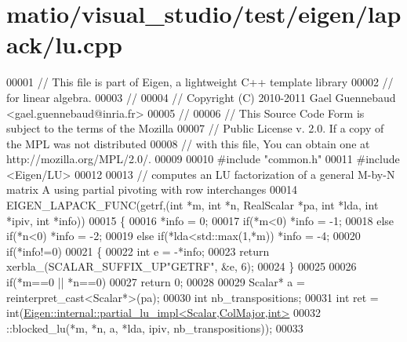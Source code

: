 \hypertarget{matio_2visual__studio_2test_2eigen_2lapack_2lu_8cpp_source}{}\section{matio/visual\+\_\+studio/test/eigen/lapack/lu.cpp}
\label{matio_2visual__studio_2test_2eigen_2lapack_2lu_8cpp_source}

\begin{DoxyCode}
00001 \textcolor{comment}{// This file is part of Eigen, a lightweight C++ template library}
00002 \textcolor{comment}{// for linear algebra.}
00003 \textcolor{comment}{//}
00004 \textcolor{comment}{// Copyright (C) 2010-2011 Gael Guennebaud <gael.guennebaud@inria.fr>}
00005 \textcolor{comment}{//}
00006 \textcolor{comment}{// This Source Code Form is subject to the terms of the Mozilla}
00007 \textcolor{comment}{// Public License v. 2.0. If a copy of the MPL was not distributed}
00008 \textcolor{comment}{// with this file, You can obtain one at http://mozilla.org/MPL/2.0/.}
00009 
00010 \textcolor{preprocessor}{#include "common.h"}
00011 \textcolor{preprocessor}{#include <Eigen/LU>}
00012 
00013 \textcolor{comment}{// computes an LU factorization of a general M-by-N matrix A using partial pivoting with row interchanges}
00014 EIGEN\_LAPACK\_FUNC(getrf,(\textcolor{keywordtype}{int} *m, \textcolor{keywordtype}{int} *n, RealScalar *pa, \textcolor{keywordtype}{int} *lda, \textcolor{keywordtype}{int} *ipiv, \textcolor{keywordtype}{int} *info))
00015 \{
00016   *info = 0;
00017         \textcolor{keywordflow}{if}(*m<0)                  *info = -1;
00018   \textcolor{keywordflow}{else}  \textcolor{keywordflow}{if}(*n<0)                  *info = -2;
00019   \textcolor{keywordflow}{else}  \textcolor{keywordflow}{if}(*lda<std::max(1,*m))   *info = -4;
00020   \textcolor{keywordflow}{if}(*info!=0)
00021   \{
00022     \textcolor{keywordtype}{int} e = -*info;
00023     \textcolor{keywordflow}{return} xerbla\_(SCALAR\_SUFFIX\_UP\textcolor{stringliteral}{"GETRF"}, &e, 6);
00024   \}
00025 
00026   \textcolor{keywordflow}{if}(*m==0 || *n==0)
00027     \textcolor{keywordflow}{return} 0;
00028 
00029   Scalar* a = \textcolor{keyword}{reinterpret\_cast<}Scalar*\textcolor{keyword}{>}(pa);
00030   \textcolor{keywordtype}{int} nb\_transpositions;
00031   \textcolor{keywordtype}{int} ret = int(\hyperlink{struct_eigen_1_1internal_1_1partial__lu__impl}{Eigen::internal::partial\_lu\_impl<Scalar,ColMajor,int>}
00032                      ::blocked\_lu(*m, *n, a, *lda, ipiv, nb\_transpositions));
00033 

\end{DoxyCode}

